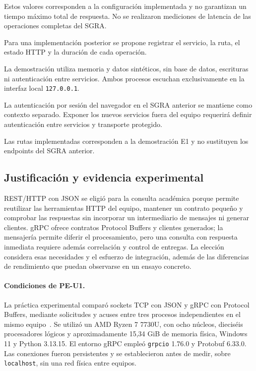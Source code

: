 Estos valores corresponden a la configuración implementada y no garantizan un tiempo máximo total de respuesta. No se realizaron mediciones de latencia de las operaciones completas del SGRA.

Para una implementación posterior se propone registrar el servicio, la ruta, el estado HTTP y la duración de cada operación.

La demostración utiliza memoria y datos sintéticos, sin base de datos, escrituras ni autenticación entre servicios. Ambos procesos escuchan exclusivamente en la interfaz local \texttt{127.0.0.1}.

La autenticación por sesión del navegador en el SGRA anterior se mantiene como contexto separado. Exponer los nuevos servicios fuera del equipo requerirá definir autenticación entre servicios y transporte protegido.

Las rutas implementadas corresponden a la demostración E1 y no sustituyen los endpoints del SGRA anterior.

\subsection{Justificación y evidencia experimental}

REST/HTTP con JSON se eligió para la consulta académica porque permite reutilizar las herramientas HTTP del equipo, mantener un contrato pequeño y comprobar las respuestas sin incorporar un intermediario de mensajes ni generar clientes. gRPC ofrece contratos Protocol Buffers y clientes generados; la mensajería permite diferir el procesamiento, pero una consulta con respuesta inmediata requiere además correlación y control de entregas. La elección considera esas necesidades y el esfuerzo de integración, además de las diferencias de rendimiento que puedan observarse en un ensayo concreto.

\paragraph{Condiciones de PE-U1.}
La práctica experimental comparó sockets TCP con JSON y gRPC con Protocol Buffers, mediante solicitudes y acuses entre tres procesos independientes en el mismo equipo~\cite{peu1-2026-resultados}. Se utilizó un AMD Ryzen 7 7730U, con ocho núcleos, dieciséis procesadores lógicos y aproximadamente 15,34 GiB de memoria física, Windows 11 y Python 3.13.15. El entorno gRPC empleó \texttt{grpcio} 1.76.0 y Protobuf 6.33.0. Las conexiones fueron persistentes y se establecieron antes de medir, sobre \texttt{localhost}, sin una red física entre equipos.

